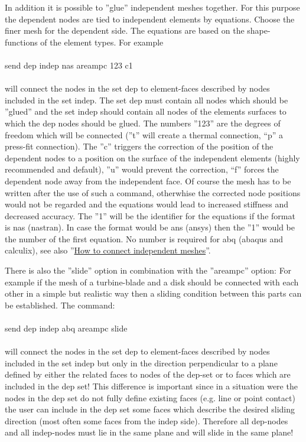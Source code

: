 \documentclass{article}
\providecommand{\htmlref}[2]{\hyperref[#2]{#1}}
\begin{document}
In addition it is possible to ''glue'' independent meshes together. For this purpose the dependent nodes are tied to independent elements by equations. Choose the finer mesh for the dependent side. The equations are based on the shape-functions of the element types. For example\\\\send dep indep nas areampc 123 c1\\\\will connect the nodes in the set dep to element-faces described by nodes included in the set indep. The set dep must contain all nodes which should be ''glued'' and the set indep should contain all nodes of the elements surfaces to which the dep nodes should be glued. The numbers ''123'' are the degrees of freedom which will be connected (''t'' will create a thermal connection, ``p'' a press-fit connection). The ''c'' triggers the correction of the position of the dependent nodes to a position on the surface of the independent elements (highly recommended and default), ''u'' would prevent the correction, ``f'' forces the dependent node away from the independent face. Of course the mesh has to be written after the use of such a command, otherwhise the corrected node positions would not be regarded and the equations would lead to increased stiffness and decreased accuracy. The ''1'' will be the identifier for the equations if the format is nas (nastran). In case the format would be ans (ansys) then the ''1'' would be the number of the first equation. No number is required for abq (abaqus and calculix), see also ''\htmlref{How to connect independent meshes}{How to connect independent meshes}''.

There is also the ''slide'' option in combination with the ''areampc'' option: For example if the mesh of a turbine-blade and a disk should be connected with each other in a simple but realistic way then a sliding condition between this parts can be established. The command:\\\\send dep indep abq areampc slide\\\\will connect the nodes in the set dep to element-faces described by nodes included in the set indep but only in the direction perpendicular to a plane defined by either the related faces to nodes of the dep-set or to faces which are included in the dep set! This difference is important since in a situation were the nodes in the dep set do not fully define existing faces (e.g. line or point contact) the user can include in the dep set some faces which describe the desired sliding direction (most often some faces from the indep side). Therefore all dep-nodes and all indep-nodes must lie in the same plane and will slide in the same plane!\\
\end{document}
